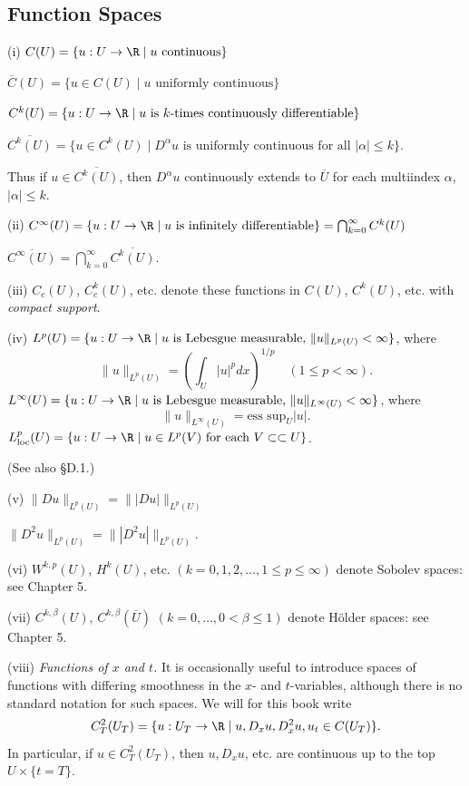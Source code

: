 \subsection{Function Spaces}
\label{sec:function-spaces-notation}

\begin{definition}
\label{def:function-space-notation}
(i) $C(U) = \{u : U \to \R \mid u \text{ continuous}\}$

$\overline{C}(U) = \{u \in C(U) \mid u \text{ uniformly continuous}\}$

$C^k(U) = \{u : U \to \R \mid u \text{ is } k\text{-times continuously differentiable}\}$

$\overline{C^k(U)} = \{u \in C^k(U) \mid D^\alpha u \text{ is uniformly continuous for all } |\alpha| \leq k\}$.

Thus if $u \in \overline{C^k(U)}$, then $D^\alpha u$ continuously extends to $\overline{U}$ for each multiindex $\alpha$, $|\alpha| \leq k$.

(ii) $C^\infty(U) = \{u : U \to \R \mid u \text{ is infinitely differentiable}\} = \bigcap_{k=0}^{\infty} C^k(U)$

$\overline{C^\infty(U)} = \bigcap_{k=0}^{\infty} \overline{C^k(U)}$.

(iii) $C_c(U)$, $C_c^k(U)$, etc. denote these functions in $C(U)$, $C^k(U)$, etc. with \textit{compact support}.

(iv) $L^p(U) = \{u : U \to \R \mid u \text{ is Lebesgue measurable, } \|u\|_{L^p(U)} < \infty\}$, where
$$\|u\|_{L^p(U)} = \left(\int_U |u|^p dx\right)^{1/p} \quad (1 \leq p < \infty).$$
$L^\infty(U) = \{u : U \to \R \mid u \text{ is Lebesgue measurable, } \|u\|_{L^\infty(U)} < \infty\}$, where
$$\|u\|_{L^\infty(U)} = \text{ess sup}_U |u|.$$
$L^p_{\text{loc}}(U) = \{u : U \to \R \mid u \in L^p(V) \text{ for each } V \subset\subset U\}$.

(See also \S D.1.)

(v) $\|Du\|_{L^p(U)} = \||Du|\|_{L^p(U)}$

$\|D^2 u\|_{L^p(U)} = \||D^2 u|\|_{L^p(U)}$.

(vi) $W^{k,p}(U)$, $H^k(U)$, etc. $(k = 0, 1, 2, \ldots, 1 \leq p \leq \infty)$ denote Sobolev spaces: see Chapter 5.

(vii) $C^{k,\beta}(U)$, $C^{k,\beta}(\overline{U})$ $(k = 0, \ldots, 0 < \beta \leq 1)$ denote H\"older spaces: see Chapter 5.

(viii) \textit{Functions of $x$ and $t$.} It is occasionally useful to introduce spaces of functions with differing smoothness in the $x$- and $t$-variables, although there is no standard notation for such spaces. We will for this book write
$$C_T^2(U_T) = \{u : U_T \to \R \mid u, D_x u, D_x^2 u, u_t \in C(U_T)\}.$$
In particular, if $u \in C_T^2(U_T)$, then $u, D_x u$, etc. are continuous up to the top $U \times \{t = T\}$.
\end{definition}

